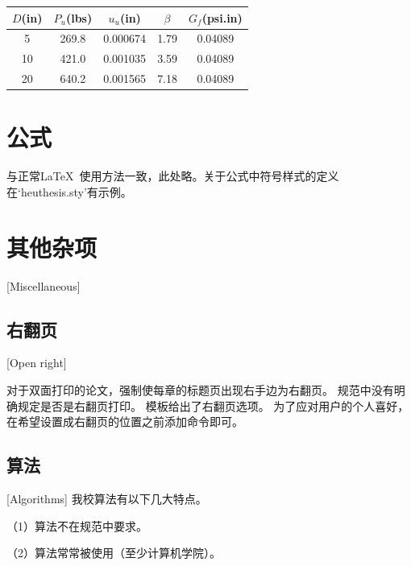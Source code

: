 \begin{table}[p]
  \centering
  \begin{sideways}
    \begin{minipage}{\textheight}
      \vspace{0.5em}\centering\wuhao
      \begin{tabular}{ccccc}
        \toprule[1.5pt]
        $D$(in) & $P_u$(lbs) & $u_u$(in) & $\beta$ & $G_f$(psi.in) \\
        \midrule[1pt]
        5       & 269.8      & 0.000674  & 1.79    & 0.04089       \\
        10      & 421.0      & 0.001035  & 3.59    & 0.04089       \\
        20      & 640.2      & 0.001565  & 7.18    & 0.04089       \\
        \bottomrule[1.5pt]
      \end{tabular}
    \end{minipage}
  \end{sideways}
\end{table}


\section{公式}
与正常\LaTeX\ 使用方法一致，此处略。关于公式中符号样式的定义在`heuthesis.sty'有示例。

\section{其他杂项}[Miscellaneous]

\subsection{右翻页}[Open right]

对于双面打印的论文，强制使每章的标题页出现右手边为右翻页。
规范中没有明确规定是否是右翻页打印。
模板给出了右翻页选项。
为了应对用户的个人喜好，在希望设置成右翻页的位置之前添加命令即可。

\subsection{算法}[Algorithms]
我校算法有以下几大特点。

（1）算法不在规范中要求。

（2）算法常常被使用（至少计算机学院）。

